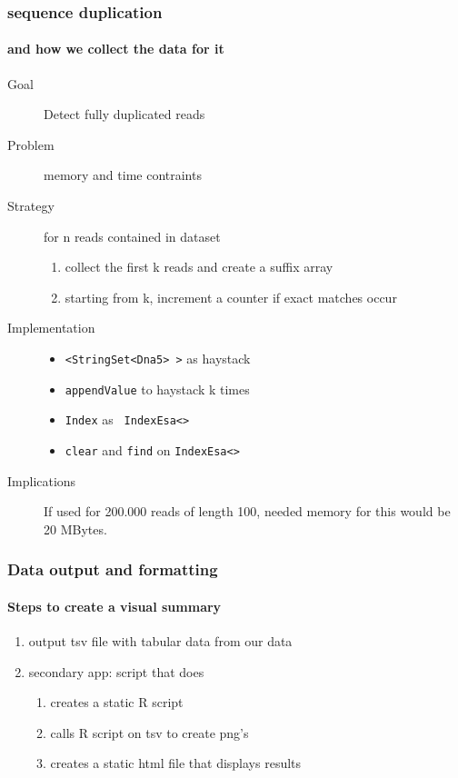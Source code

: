 \documentclass{beamer}
\begin{document}
\begin{frame}
 \frametitle{sequence duplication}
 \framesubtitle{and how we collect the data for it}
\begin{description}
 \item[Goal] Detect fully duplicated reads  
 \item[Problem] memory and time contraints
 \item[Strategy] for n reads contained in dataset 
    \begin{enumerate}
      \item collect the first k reads and create a suffix array
      \item starting from k, increment a counter if exact matches occur 
    \end{enumerate}
 \item[Implementation]
 \begin{itemize}
  \item \small{\texttt{<StringSet<Dna5> >}} as haystack
  \item \small{\texttt{appendValue}} to haystack k times
  \item \small{\texttt{Index}} as \small{\texttt{ IndexEsa<>}} 
  \item \small{\texttt{clear}} and \small{\texttt{find}} on \small{\texttt{IndexEsa<>}}
 \end{itemize}
 \item[Implications] If used for 200.000 reads of length 100, needed memory for this would be 20 MBytes.
\end{description}


\end{frame}




\begin{frame}
 \frametitle{Data output and formatting}
 \framesubtitle{Steps to create a visual summary}
\begin{enumerate}
 \item output tsv file with tabular data from our data 
 \item secondary app: script that does
  \begin{enumerate}
   \item creates a static R script
   \item calls R script on tsv to create png's
   \item creates a static html file that displays results   
  \end{enumerate}
\end{enumerate}
 
\end{frame}
\end{document}
